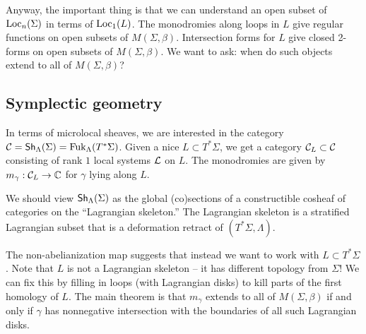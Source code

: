 \documentclass{article}
\begin{document}
Anyway, the important thing is that we can understand an open subset of $\operatorname{Loc}_n(\Sigma)$ in terms of $\operatorname{Loc}_1(L)$.
The monodromies along loops in $L$ give regular functions on open subsets of $M(\Sigma, \beta)$.
Intersection forms for $L$ give closed 2-forms on open subsets of $M(\Sigma, \beta)$.
We want to ask: when do such objects extend to all of $M(\Sigma, \beta)$?

\subsection{Symplectic geometry}

In terms of microlocal sheaves, we are interested in the category $\mathcal{C} = \mathsf{Sh}_\Lambda(\Sigma) = \operatorname{Fuk}_\Lambda(T^* \Sigma)$.
Given a nice $L \subset T^* \Sigma$, we get a category $\mathcal{C}_L \subset \mathcal{C}$ consisting of rank $1$ local systems $\mathcal{L}$ on $L$.
The monodromies are given by $m_\gamma: \mathcal{C}_L \to \mathbb{C}$ for $\gamma$ lying along $L$.

We should view $\mathsf{Sh}_\Lambda(\Sigma)$ as the global (co)sections of a constructible cosheaf of categories on the ``Lagrangian skeleton.''
The Lagrangian skeleton is a stratified Lagrangian subset that is a deformation retract of $(T^* \Sigma, \Lambda)$.

The non-abelianization map suggests that instead we want to work with $L \subset T^* \Sigma$.
Note that $L$ is not a Lagrangian skeleton -- it has different topology from $\Sigma$!
We can fix this by filling in loops (with Lagrangian disks) to kill parts of the first homology of $L$.
The main theorem is that $m_\gamma$ extends to all of $M(\Sigma, \beta)$ if and only if $\gamma$ has nonnegative intersection with the boundaries of all such Lagrangian disks.
\end{document}
